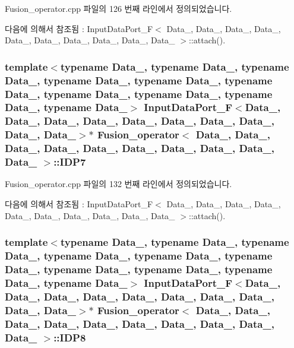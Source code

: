 Fusion\+\_\+operator.\+cpp 파일의 126 번째 라인에서 정의되었습니다.



다음에 의해서 참조됨 \+:  Input\+Data\+Port\+\_\+\+F$<$ Data\+\_, Data\+\_, Data\+\_, Data\+\_, Data\+\_, Data\+\_, Data\+\_, Data\+\_, Data\+\_, Data\+\_ $>$\+::attach().

\subsubsection[{\texorpdfstring{I\+D\+P7}{IDP7}}]{\setlength{\rightskip}{0pt plus 5cm}template$<$typename Data\+\_, typename Data\+\_, typename Data\+\_, typename Data\+\_, typename Data\+\_, typename Data\+\_, typename Data\+\_, typename Data\+\_, typename Data\+\_, typename Data\+\_$>$ {\bf Input\+Data\+Port\+\_\+F}$<$Data\+\_, Data\+\_, Data\+\_, Data\+\_, Data\+\_, Data\+\_, Data\+\_, Data\+\_, Data\+\_, Data\+\_$>$$\ast$ {\bf Fusion\+\_\+operator}$<$ Data\+\_, Data\+\_, Data\+\_, Data\+\_, Data\+\_, Data\+\_, Data\+\_, Data\+\_, Data\+\_, Data\+\_ $>$\+::I\+D\+P7}\hypertarget{classFusion__operator_a03fa8722d419112cc6f9d21354453985}{}\label{classFusion__operator_a03fa8722d419112cc6f9d21354453985}


Fusion\+\_\+operator.\+cpp 파일의 132 번째 라인에서 정의되었습니다.



다음에 의해서 참조됨 \+:  Input\+Data\+Port\+\_\+\+F$<$ Data\+\_, Data\+\_, Data\+\_, Data\+\_, Data\+\_, Data\+\_, Data\+\_, Data\+\_, Data\+\_, Data\+\_ $>$\+::attach().

\subsubsection[{\texorpdfstring{I\+D\+P8}{IDP8}}]{\setlength{\rightskip}{0pt plus 5cm}template$<$typename Data\+\_, typename Data\+\_, typename Data\+\_, typename Data\+\_, typename Data\+\_, typename Data\+\_, typename Data\+\_, typename Data\+\_, typename Data\+\_, typename Data\+\_$>$ {\bf Input\+Data\+Port\+\_\+F}$<$Data\+\_, Data\+\_, Data\+\_, Data\+\_, Data\+\_, Data\+\_, Data\+\_, Data\+\_, Data\+\_, Data\+\_$>$$\ast$ {\bf Fusion\+\_\+operator}$<$ Data\+\_, Data\+\_, Data\+\_, Data\+\_, Data\+\_, Data\+\_, Data\+\_, Data\+\_, Data\+\_, Data\+\_ $>$\+::I\+D\+P8}\hypertarget{classFusion__operator_afdf3f278a54f1dfeb655889ab7ec9ce7}{}\label{classFusion__operator_afdf3f278a54f1dfeb655889ab7ec9ce7}


